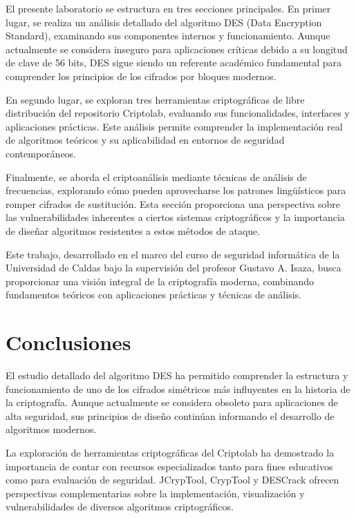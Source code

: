 \documentclass[12pt,a4paper]{article}
\begin{document}
El presente laboratorio se estructura en tres secciones principales. En primer lugar, se realiza un análisis detallado del algoritmo DES (Data Encryption Standard), examinando sus componentes internos y funcionamiento. Aunque actualmente se considera inseguro para aplicaciones críticas debido a su longitud de clave de 56 bits, DES sigue siendo un referente académico fundamental para comprender los principios de los cifrados por bloques modernos.

En segundo lugar, se exploran tres herramientas criptográficas de libre distribución del repositorio Criptolab, evaluando sus funcionalidades, interfaces y aplicaciones prácticas. Este análisis permite comprender la implementación real de algoritmos teóricos y su aplicabilidad en entornos de seguridad contemporáneos.

Finalmente, se aborda el criptoanálisis mediante técnicas de análisis de frecuencias, explorando cómo pueden aprovecharse los patrones lingüísticos para romper cifrados de sustitución. Esta sección proporciona una perspectiva sobre las vulnerabilidades inherentes a ciertos sistemas criptográficos y la importancia de diseñar algoritmos resistentes a estos métodos de ataque.

Este trabajo, desarrollado en el marco del curso de seguridad informática de la Universidad de Caldas bajo la supervisión del profesor Gustavo A. Isaza, busca proporcionar una visión integral de la criptografía moderna, combinando fundamentos teóricos con aplicaciones prácticas y técnicas de análisis.











\section{Conclusiones}

El estudio detallado del algoritmo DES ha permitido comprender la estructura y funcionamiento de uno de los cifrados simétricos más influyentes en la historia de la criptografía. Aunque actualmente se considera obsoleto para aplicaciones de alta seguridad, sus principios de diseño continúan informando el desarrollo de algoritmos modernos.

La exploración de herramientas criptográficas del Criptolab ha demostrado la importancia de contar con recursos especializados tanto para fines educativos como para evaluación de seguridad. JCrypTool, CrypTool y DESCrack ofrecen perspectivas complementarias sobre la implementación, visualización y vulnerabilidades de diversos algoritmos criptográficos.
\end{document}
